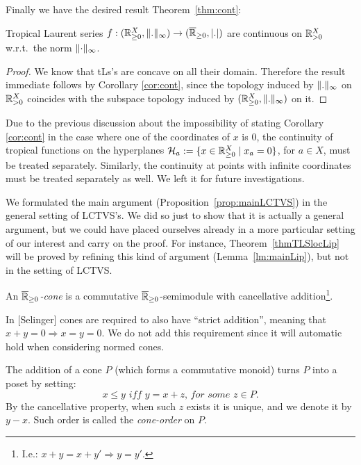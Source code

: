 Finally we have the desired result Theorem~\ref{thm:cont}:

\begin{theorem}
 Tropical Laurent series $f:({\mathbb{R}}_{\geq 0}^X,\lVert.\rVert_\infty) \to (\overline{\mathbb{R}}_{\geq 0},\left\lvert.\right\rvert)$ are continuous on ${\mathbb{R}}_{> 0}^X$ w.r.t.\ the norm $\lVert\cdot\rVert_\infty$.
\end{theorem}
\begin{proof}
 We know that tLs's are concave on all their domain.
 Therefore the result immediate follows by Corollary \ref{cor:cont}, since the topology induced by $\lVert.\rVert_\infty$ on ${\mathbb{R}}_{> 0}^X$ coincides with the subspace topology induced by $({\mathbb{R}}_{\geq 0}^X,\lVert.\rVert_\infty)$ on it.
\end{proof}

Due to the previous discussion about the impossibility of stating Corollary \ref{cor:cont} in the case where one of the coordinates of $x$ is $0$, the continuity of tropical functions on the hyperplanes $\mathcal H_a:=\{x\in {\mathbb{R}}_{\geq 0}^X \mid x_a=0\}$, for $a\in X$, must be treated separately.
Similarly, the continuity at points with infinite coordinates must be treated separately as well.
We left it for future investigations.

\begin{remark}
 We formulated the main argument (Proposition~\ref{prop:mainLCTVS}) in the general setting of LCTVS's.
We did so just to show that it is actually a general argument, but we could have placed ourselves already in a more particular setting of our interest and carry on the proof.
For instance, Theorem~\ref{thmTLSlocLip} will be proved by refining this kind of argument (Lemma~\ref{lm:mainLip}), but not in the setting of LCTVS.
\end{remark} 


\begin{definition}
 An \emph{$\overline{\mathbb{R}}_{\geq 0}$-cone} is a commutative $\overline{\mathbb{R}}_{\geq 0}$-semimodule with cancellative addition\footnote{I.e.: $x+y=x+y' \Rightarrow y=y'$.}.
\end{definition}

In [Selinger] cones are required to also have ``strict addition'', meaning that $x+y=0 \Rightarrow x=y=0$.
We do not add this requirement since it will automatic hold when considering normed cones.

\begin{remark}
 The addition of a cone $P$ (which forms a commutative monoid) turns $P$ into a poset by setting:
 \[
  x \leq y \textit{ iff } y=x+z \textit{, for some }z\in P.
 \]
 By the cancellative property, when such $z$ exists it is unique, and we denote it by $y-x$.
 Such order is called the \emph{cone-order} on $P$.
\end{remark}

